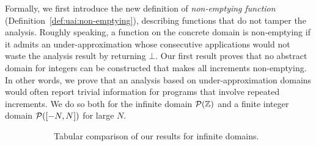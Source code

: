 Formally, we first introduce the new definition of \emph{non-emptying function} (Definition~\ref{def:uai:non-emptying}), describing functions that do not tamper the analysis. Roughly speaking, a function on the concrete domain is non-emptying if it admits an under-approximation whose consecutive applications would not waste the analysis result by returning $\bot$.
Our first result proves that no abstract domain for integers can be constructed that makes all increments non-emptying. In other words, we prove that an analysis based on under-approximation domains would often report trivial information for programs that involve repeated increments. We do so both for the infinite domain $\mathcal{P}(\mathbb{Z})$ and a finite integer domain $\mathcal{P}([-N, N])$ for large $N$.

\begin{figure}[t]
	\begin{subfigure}{\textwidth}
		\centering
		\caption{Tabular comparison of our results for infinite domains.}
		\label{fig:uai:tab-summary-infinite}
		\vspace{1ex}
	\end{subfigure}
	\begin{subfigure}{\textwidth}
		\centering
		\vspace*{0.5ex}
\end{subfigure}
\end{figure}
